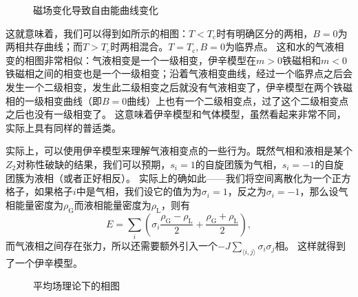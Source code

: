 \documentclass[hyperref, UTF8, a4paper]{ctexart}
\newcommand*{\pair}[1]{\langle #1 \rangle}
\renewcommand{\autoref}{\prettyref}
\begin{document}
\begin{figure}
{
        \label{fig:big-t-negative-b-free-energy}
    }
    \caption{磁场变化导致自由能曲线变化}
    \label{fig:mf-b-and-free-energy}
\end{figure}

这就意味着，我们可以得到如\autoref{fig:mf-phase-diagram}所示的相图：$T<T_\text{c}$时有明确区分的两相，$B=0$为两相共存曲线；而$T>T_\text{c}$时两相混合。$T=T_\text{c},B=0$为临界点。
这和水的气液相变的相图非常相似：气液相变是一个一级相变，伊辛模型在$m>0$铁磁相和$m<0$铁磁相之间的相变也是一个一级相变；沿着气液相变曲线，经过一个临界点之后会发生一个二级相变，发生此二级相变之后就没有气液相变了，伊辛模型在两个铁磁相的一级相变曲线（即$B=0$曲线）上也有一个二级相变点，过了这个二级相变点之后也没有一级相变了。
这意味着伊辛模型和气体模型，虽然看起来非常不同，实际上具有同样的普适类。

实际上，可以使用伊辛模型来理解气液相变点的一些行为。既然气相和液相是某个$Z_2$对称性破缺的结果，我们可以预期，$s_i=1$的自旋团簇为气相，$s_i=-1$的自旋团簇为液相（或者正好相反）。
实际上的确如此——我们将空间离散化为一个正方格子，如果格子$i$中是气相，我们设它的值为为$\sigma_i = 1$，反之为$\sigma_i = -1$，那么设气相能量密度为$\rho_\text{G}$而液相能量密度为$\rho_\text{L}$，则有
\[
    E = \sum_i \left( \sigma_i \frac{\rho_\text{G} - \rho_\text{L}}{2} + \frac{\rho_\text{G} + \rho_\text{L}}{2} \right),
\]
而气液相之间存在张力，所以还需要额外引入一个$-J \sum_{\pair{i, j}} \sigma_i \sigma_j$相。
这样就得到了一个伊辛模型。

\begin{figure}
    \centering
    \caption{平均场理论下的相图}
    \label{fig:mf-phase-diagram}
\end{figure}
\end{document}
